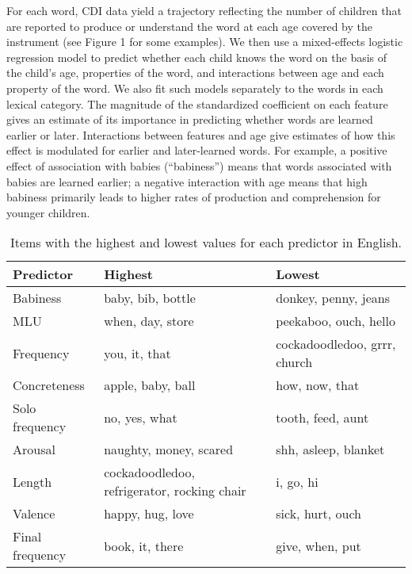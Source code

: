 \documentclass[english,man]{apa6}
\theoremstyle{definition}
\theoremstyle{definition}
\theoremstyle{definition}
\theoremstyle{remark}
\begin{document}
For each word, CDI data yield a trajectory reflecting the number of
children that are reported to produce or understand the word at each age
covered by the instrument (see Figure 1 for some examples). We then use
a mixed-effects logistic regression model to predict whether each child
knows the word on the basis of the child's age, properties of the word,
and interactions between age and each property of the word. We also fit
such models separately to the words in each lexical category. The
magnitude of the standardized coefficient on each feature gives an
estimate of its importance in predicting whether words are learned
earlier or later. Interactions between features and age give estimates
of how this effect is modulated for earlier and later-learned words. For
example, a positive effect of association with babies
(\enquote{babiness}) means that words associated with babies are learned
earlier; a negative interaction with age means that high babiness
primarily leads to higher rates of production and comprehension for
younger children.

\begin{table}[t]
\centering
\begin{tabular}{lll}
  \hline
Predictor & Highest & Lowest \\ 
  \hline
Babiness & baby, bib, bottle & donkey, penny, jeans \\ 
  MLU & when, day, store & peekaboo, ouch, hello \\ 
  Frequency & you, it, that & cockadoodledoo, grrr, church \\ 
  Concreteness & apple, baby, ball & how, now, that \\ 
  Solo frequency & no, yes, what & tooth, feed, aunt \\ 
  Arousal & naughty, money, scared & shh, asleep, blanket \\ 
  Length & cockadoodledoo, refrigerator, rocking chair & i, go, hi \\ 
  Valence & happy, hug, love & sick, hurt, ouch \\ 
  Final frequency & book, it, there & give, when, put \\ 
   \hline
\end{tabular}
\caption{Items with the highest and lowest values for each predictor in English.} 
\label{table:extremes}
\end{table}
\end{document}
